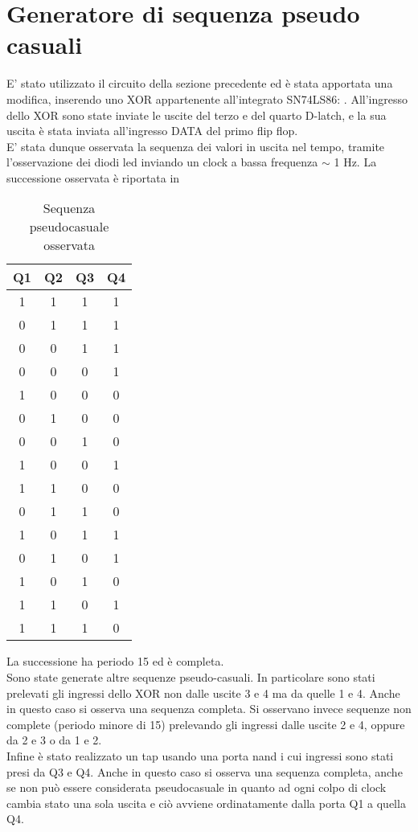 \section{Generatore di sequenza pseudo casuali}
E' stato utilizzato il circuito della sezione precedente ed è stata apportata una modifica, inserendo uno XOR appartenente all'integrato SN74LS86: . All'ingresso dello XOR sono state inviate le uscite del terzo e del quarto D-latch, e la sua uscita è stata inviata all'ingresso DATA del primo flip flop.\\
E' stata dunque osservata la sequenza dei valori in uscita nel tempo, tramite l'osservazione dei diodi led inviando un clock a bassa frequenza $\sim$ 1 Hz. La successione osservata è riportata in 

\begin{table}[h]
	\centering
	\begin{tabular}{cccc}
		Q1 & Q2 & Q3 & Q4 \\
		\midrule
		 1 & 1 & 1 & 1\\
		 0 & 1 & 1 & 1\\
		 0 & 0 & 1 & 1\\
		 0 & 0 & 0 & 1\\
		 1 & 0 & 0 & 0\\
	 	 0 & 1 & 0 & 0\\
	 	 0 & 0 & 1 & 0\\
	 	 1 & 0 & 0 & 1\\
	 	 1 & 1 & 0 & 0\\
	 	 0 & 1 & 1 & 0\\
	 	 1 & 0 & 1 & 1\\
	 	 0 & 1 & 0 & 1\\
	 	 1 & 0 & 1 & 0\\
	 	 1 & 1 & 0 & 1\\
	 	 1 & 1 & 1 & 0\\
		 
 	\end{tabular}
	\caption{ Sequenza pseudocasuale osservata }
	\label{t:sequenza}
\end{table} 
La successione ha periodo 15 ed è completa.\\
Sono state generate altre sequenze pseudo-casuali. In particolare sono stati prelevati gli ingressi dello XOR non dalle uscite 3 e 4 ma da quelle 1 e 4. Anche in questo caso si osserva una sequenza completa. Si osservano invece sequenze non complete (periodo minore di 15) prelevando gli ingressi dalle uscite 2 e 4, oppure da 2 e 3 o da 1 e 2.\\
Infine è stato realizzato un tap usando una porta nand i cui ingressi sono stati presi da Q3 e Q4. Anche in questo caso si osserva una sequenza completa, anche se non può essere considerata pseudocasuale in quanto ad ogni colpo di clock cambia stato una sola uscita e ciò avviene ordinatamente dalla porta Q1 a quella Q4.

